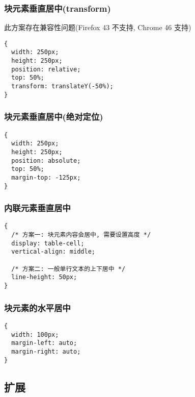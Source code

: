 \subsubsection{块元素垂直居中(transform)}\label{ux5757ux5143ux7d20ux5782ux76f4ux5c45ux4e2dtransform}

此方案存在兼容性问题(Firefox 43 不支持, Chrome 46 支持)

\begin{lstlisting}
{
  width: 250px;
  height: 250px;
  position: relative;
  top: 50%;
  transform: translateY(-50%);
}
\end{lstlisting}

\subsubsection{块元素垂直居中(绝对定位)}\label{ux5757ux5143ux7d20ux5782ux76f4ux5c45ux4e2dux7eddux5bf9ux5b9aux4f4d}

\begin{lstlisting}
{
  width: 250px;
  height: 250px;
  position: absolute;
  top: 50%;
  margin-top: -125px;
}
\end{lstlisting}

\subsubsection{内联元素垂直居中}\label{ux5185ux8054ux5143ux7d20ux5782ux76f4ux5c45ux4e2d}

\begin{lstlisting}
{
  /* 方案一: 块元素内容会居中, 需要设置高度 */
  display: table-cell;
  vertical-align: middle;

  /* 方案二: 一般单行文本的上下居中 */
  line-height: 50px;
}
\end{lstlisting}

\subsubsection{块元素的水平居中}\label{ux5757ux5143ux7d20ux7684ux6c34ux5e73ux5c45ux4e2d}

\begin{lstlisting}
{
  width: 100px;
  margin-left: auto;
  margin-right: auto;
}
\end{lstlisting}

\subsection{扩展}\label{ux6269ux5c55}

